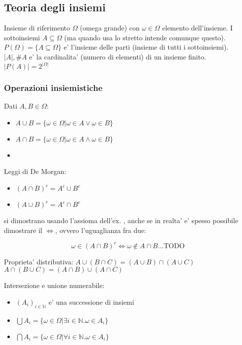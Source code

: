 \documentclass{report}
\begin{document}
\subsection{Teoria degli insiemi}
Insieme di riferimento $ \Omega $ (omega grande) con $ \omega \in \Omega $ elemento dell'insieme. I sottoinsiemi $ A \subseteq \Omega $ (ma quando usa lo stretto intende comunque questo). $ P(\Omega) = \{A \subseteq \Omega\} $ e' l'insieme delle parti (insieme di tutti i sottoinsiemi). $ |A|, \#A $ e' la cardinalita' (numero di elementi) di un insieme finito.
 $ |P(A)| = 2^{|\Omega|} $

\subsubsection{Operazioni insiemistiche}
Dati $ A,B \in \Omega $:
\begin{itemize}
\item $ A \cup B = \{\omega \in \Omega | \omega \in A \lor \omega \in B\} $
  \item $ A \cap B = \{\omega \in \Omega | \omega \in A \land \omega \in B\} $
  \item 
\end{itemize}

Leggi di De Morgan: 
\begin{itemize}
  \item $ (A \cap B)^c = A^c \cup B^c $
  \item $ (A \cup B)^c = A^c \cap B^c $
\end{itemize}

si dimostrano usando l'assioma dell'ex. , anche se in realta' e' spesso possibile dimostrare il $ \iff $, ovvero l'uguaglianza fra due: 

\[
  \omega \in (A \cap B)^c \iff \omega \not\in A \cap B ... \text{TODO}
\]

Proprieta' distributiva: $ A \cup (B\cap C) = (A \cup B) \cap (A \cup C) $
$ A \cap (B \cup C)= (A \cap B) \cup (A \cap C ) $

Intersezione e unione numerabile: 

\begin{itemize}
  \item $ (A_i)_{i \in \mathbb{N}} $ e' una successione di insiemi
  \item $ \bigcup A_i = \{\omega \in \Omega | \exists i \in \mathbb{N} . \omega \in A_i \} $
  \item $ \bigcap A_i = \{\omega \in \Omega | \forall i \in \mathbb{N} . \omega \in A_i \} $
\end{itemize}
\end{document}
